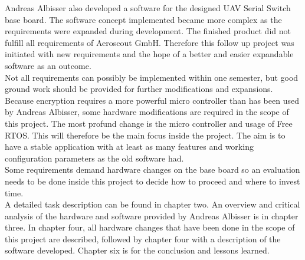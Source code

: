 Andreas Albisser also developed a software for the designed UAV Serial Switch base board. The software concept implemented became more complex as the requirements were expanded during development. The finished product did not fulfill all requirements of Aeroscout GmbH. Therefore this follow up project was initiated with new requirements and the hope of a better and easier expandable software as an outcome.\\
Not all requirements can possibly be implemented within one semester, but good ground work should be provided for further modifications and expansions.\\
Because encryption requires a more powerful micro controller than has been used by Andreas Albisser, some hardware modifications are required in the scope of this project. The most profund change is the micro controller and usage of Free RTOS. This will therefore be the main focus inside the project. The aim is to have a stable application with at least as many features and working configuration parameters as the old software had.\\
Some requirements demand hardware changes on the base board so an evaluation needs to be done inside this project to decide how to proceed and where to invest time.\\
A detailed task description can be found in chapter two. An overview and critical analysis of the hardware and software provided by Andreas Albisser is in chapter three. In chapter four, all hardware changes that have been done in the scope of this project are described, followed by chapter four with a description of the software developed. Chapter six is for the conclusion and lessons learned.